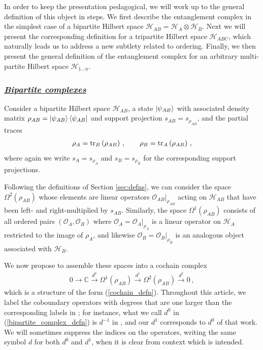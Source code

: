 \documentclass[12pt]{article}
\newcommand{\ul}[1]{{\underline{#1}}}
\numberwithin{equation}{section}
\newcommand{\Honeton}{{\mathcal{H}_{\ul{1} \ldots \ul{n}}}}
\begin{document}
In order to keep the presentation pedagogical, we will work up to the general definition of this object in steps. We first describe the entanglement complex in the simplest case of a bipartite Hilbert space $\mathcal{H}_{AB} = \mathcal{H}_A \otimes \mathcal{H}_B$. Next we will present the corresponding definition for a tripartite Hilbert space $\mathcal{H}_{ABC}$, which naturally leads us to address a new subtlety related to ordering. Finally, we then present the general definition of the entanglement complex for an arbitrary multi-partite Hilbert space $\Honeton$.

\subsubsection*{\ul{\it Bipartite complexes}}

Consider a bipartite Hilbert space $\mathcal{H}_{AB}$, a state $\ket{\psi_{AB}}$ with associated density matrix $\rho_{AB} = \ket{\psi_{AB}} \bra{\psi_{AB}}$ and support projection $s_{AB} = s_{\rho_{AB}}$, and the partial traces
%
\begin{align}
    \rho_A = \tr_B \left( \rho_{AB} \right) \, , \qquad \rho_B = \tr_A \left( \rho_{AB} \right) \, ,
\end{align}
%
where again we write $s_A = s_{\rho_A}$ and $s_B = s_{\rho_B}$ for the corresponding support projections.

Following the definitions of Section \ref{sec:defns}, we can consider the space $\Omega^2 ( \rho_{AB} )$ whose elements are linear operators $\mathcal{O}_{AB} \big\vert_{\rho_{AB}}$ acting on $\mathcal{H}_{AB}$ that have been left- and right-multiplied by $s_{AB}$. Similarly, the space $\Omega^1 ( \rho_{AB} )$ consists of all ordered pairs $(\mathcal{O}_A, \mathcal{O}_B)$ where $\mathcal{O}_A = \mathcal{O}_A \big\vert_{\rho_A}$ is a linear operator on $\mathcal{H}_A$ restricted to the image of $\rho_A$, and likewise $\mathcal{O}_B = \mathcal{O}_B \big\vert_{\rho_B}$ is an analogous object associated with $\mathcal{H}_B$.

We now propose to assemble these spaces into a cochain complex
%
\begin{align}\label{bipartite_complex_defn}
    0 \to \mathbb{C} \xrightarrow{d^{0}} \Omega^1 ( \rho_{AB} ) \xrightarrow{d^{1}} \Omega^2 ( \rho_{AB} ) \xrightarrow{d^2} 0 \, ,
\end{align}
%
which is a structure of the form (\ref{cochain_defn}). Throughout this article, we label the coboundary operators with degrees that are one larger than the corresponding labels in \cite{Mainiero:2019enr}; for instance, what we call $d^0$ in (\ref{bipartite_complex_defn}) is $d^{-1}$ in \cite{Mainiero:2019enr}, and our $d^1$ corresponds to $d^0$ of that work. We will sometimes suppress the indices on the operators, writing the same symbol $d$ for both $d^{0}$ and $d^1$, when it is clear from context which is intended.
\end{document}
